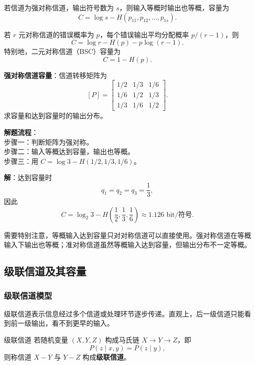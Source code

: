 若信道为强对称信道，输出符号数为 $s$，则输入等概时输出也等概，容量为
\[
C=\log s-H(p_{11},p_{12},\dots,p_{1s}).
\]

若 $r$ 元对称信道的错误概率为 $p$，每个错误输出平均分配概率 $p/(r-1)$，则
\[
C=\log r-H(p)-p\log(r-1).
\]
特别地，二元对称信道（BSC）容量为
\[
C=1-H(p).
\]

\begin{example}
\label{ex:ch6-strongly-symmetric-capacity}
\textbf{强对称信道容量}：信道转移矩阵为
\[
[P]=\begin{bmatrix}
1/2&1/3&1/6\\
1/6&1/2&1/3\\
1/3&1/6&1/2
\end{bmatrix}.
\]
求容量和达到容量时的输出分布。

\noindent \textbf{解题流程}：\\[2pt]
步骤一：判断矩阵为强对称。\\
步骤二：输入等概达到容量，输出也等概。\\
步骤三：用 $C=\log3-H(1/2,1/3,1/6)$。

\textbf{解}：达到容量时
\[
q_1=q_2=q_3=\frac13,
\]
因此
\[
C=\log_2 3-H\left(\frac12,\frac13,\frac16\right)\approx1.126\text{ bit/符号}.
\]
\end{example}

需要特别注意，等概输入达到容量只对对称信道可以直接使用。强对称信道在等概输入下输出也等概；准对称信道虽然等概输入达到容量，但输出分布不一定等概。

\subsection{级联信道及其容量}

\subsubsection{级联信道模型}
级联信道表示信息经过多个信道或处理环节逐步传递。直观上，后一级信道只能看到前一级输出，看不到更早的输入。

\begin{definitionBox}{级联信道}
若随机变量 $(X,Y,Z)$ 构成马氏链 $X\to Y\to Z$，即
\[
P(z\mid x,y)=P(z\mid y),
\]
则称信道 $X-Y$ 与 $Y-Z$ 构成\textbf{级联信道}。
\end{definitionBox}

\begin{center}
\end{center}

